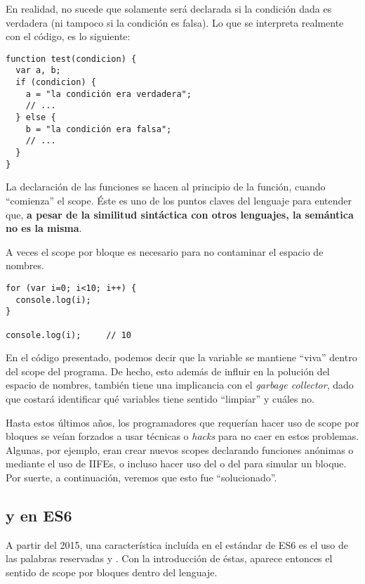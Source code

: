 En realidad, no sucede que  solamente será declarada si la condición dada es verdadera (ni tampoco  si la condición es falsa). Lo que se interpreta realmente con el código, es lo siguiente:

\begin{lstlisting}
function test(condicion) {
  var a, b;
  if (condicion) {
    a = "la condición era verdadera";
    // ...
  } else {
    b = "la condición era falsa";
    // ...
  }
}
\end{lstlisting}

La declaración de las funciones se hacen al principio de la función, cuando "`comienza"' el scope. Éste es uno de los puntos claves del lenguaje para entender que, \textbf{a pesar de la similitud sintáctica con otros lenguajes, la semántica no es la misma}. 

A veces el scope por bloque es necesario para no contaminar el espacio de nombres. 

\begin{lstlisting}[title={Contaminando el espacio de nombres}]
for (var i=0; i<10; i++) {
  console.log(i);
}

console.log(i);		// 10
\end{lstlisting}

En el código presentado, podemos decir que la variable  se mantiene "`viva"' dentro del scope del programa. De hecho, esto además de influir en la polución del espacio de nombres, también tiene una implicancia con el \textit{garbage collector}, dado que costará identificar qué variables tiene sentido "`limpiar"' y cuáles no.

Hasta estos últimos años, los programadores que requerían hacer uso de scope por bloques se veían forzados a usar técnicas o \textit{hacks} para no caer en estos problemas. Algunas, por ejemplo, eran crear nuevos scopes declarando funciones anónimas o mediante el uso de IIFEs, o incluso hacer uso del  o del  para simular un bloque. Por suerte, a continuación, veremos que esto fue "`solucionado"'.

\subsection{ y  en ES6}
\label{subsec:letyconst}

A partir del 2015, una característica incluída en el estándar de ES6 es el uso de las palabras reservadas  y . Con la introducción de éstas, aparece entonces el sentido de scope por bloques dentro del lenguaje.

